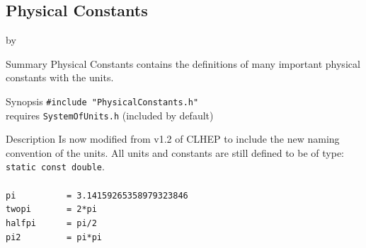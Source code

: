 \documentclass[twoside]{article}
\newcommand{\comp}[1]{\texttt{#1}}%
\newcommand{\entrylabel}[1]{\mbox{\textbf{{#1}}}\hfil}%
\newenvironment{entry}
{\begin{list}{}%
    {\renewcommand{\makelabel}{\entrylabel}%
     \setlength{\labelwidth}{90pt}%
     \setlength{\leftmargin}{\labelwidth}
     \advance\leftmargin by \labelsep%
      }%
    }%
  {\end{list}}
\newcommand{\Entrylabel}[1]%
{\raisebox{0pt}[1ex][0pt]{\makebox[\labelwidth][l]%
    {\parbox[t]{\labelwidth}{\hspace{0pt}\textbf{{#1}}}}}}
\newenvironment{Entry}%
{\renewcommand{\entrylabel}{\Entrylabel}\begin{entry}}%
  {\end{entry}}
\begin{document}
\subsection{Physical Constants} 
\begin{Entry}
\item[Summary]
  Physical Constants contains the definitions of many
  important physical constants with the units.
        

\item[Synopsis]
  \verb+#include "PhysicalConstants.h"+ \\  
  requires \comp{SystemOfUnits.h} (included by default)
  
  
\item[Description]
  Is now modified from v1.2 of CLHEP  to include the
  new naming convention of the units.  All units
  and constants are still defined to be of type:\\ \comp{static const double}. \\ \\
  \verb+pi          = 3.14159265358979323846+ \\   
  \verb+twopi       = 2*pi+  \\                    
  \verb+halfpi      = pi/2+ \\                     
  \verb+pi2         = pi*pi+ \\                    
  

\end{Entry}
\end{document}
